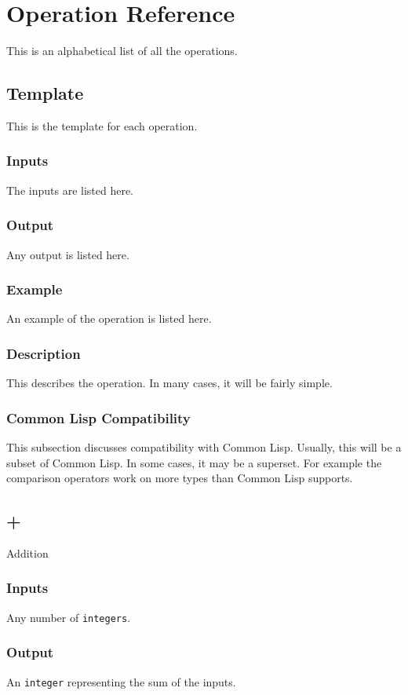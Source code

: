 \documentclass[10pt, openany]{book}
\newcommand{\datatype}[1]{\texttt{#1}}
\newcommand{\cl}{Common Lisp}
\begin{document}
\chapter{Operation Reference}
This is an alphabetical list of all the operations.
\section{Template}
This is the template for each operation.
\subsection{Inputs}
The inputs are listed here.
\subsection{Output}
Any output is listed here.
\subsection{Example}
An example of the operation is listed here.
\subsection{Description}
This describes the operation.  In many cases, it will be fairly simple.
\subsection{Common Lisp Compatibility}
This subsection discusses compatibility with \cl.  Usually, this will be a subset of \cl.  In some cases, it may be a superset.  For example the comparison operators work on more types than \cl{} supports.

\section{+}
Addition
\subsection{Inputs}
Any number of \datatype{integers}.
\subsection{Output}
An \datatype{integer} representing the sum of the inputs.
\end{document}
